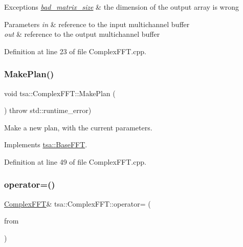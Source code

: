 \begin{DoxyExceptions}{Exceptions}
{\em \hyperlink{classtsa_1_1bad__matrix__size}{bad\+\_\+matrix\+\_\+size}} & the dimension of the output array is wrong\\
\hline
\end{DoxyExceptions}

\begin{DoxyParams}{Parameters}
{\em in} & reference to the input multichannel buffer \\
\hline
{\em out} & reference to the output multichannel buffer \\
\hline
\end{DoxyParams}


Definition at line 23 of file Complex\+F\+F\+T.\+cpp.

\mbox{\label{classtsa_1_1_complex_f_f_t_a05acda3ab3fbb2ead70421e587cdd210}} 
\subsubsection{\texorpdfstring{Make\+Plan()}{MakePlan()}}
{\footnotesize\ttfamily void tsa\+::\+Complex\+F\+F\+T\+::\+Make\+Plan (\begin{DoxyParamCaption}{ }\end{DoxyParamCaption}) throw  std\+::runtime\+\_\+error) \hspace{0.3cm}{\ttfamily [virtual]}}

Make a new plan, with the current parameters. 

Implements \hyperlink{classtsa_1_1_base_f_f_t_a9af0c36413173821cac8dbdce9cfe3b4}{tsa\+::\+Base\+F\+FT}.



Definition at line 49 of file Complex\+F\+F\+T.\+cpp.

\mbox{\label{classtsa_1_1_complex_f_f_t_ae644ce76d2adce323c4244f65735d987}} 
\subsubsection{\texorpdfstring{operator=()}{operator=()}}
{\footnotesize\ttfamily \hyperlink{classtsa_1_1_complex_f_f_t}{Complex\+F\+FT}\& tsa\+::\+Complex\+F\+F\+T\+::operator= (\begin{DoxyParamCaption}\item[{const \hyperlink{classtsa_1_1_complex_f_f_t}{Complex\+F\+FT} \&}]{from }\end{DoxyParamCaption})}

